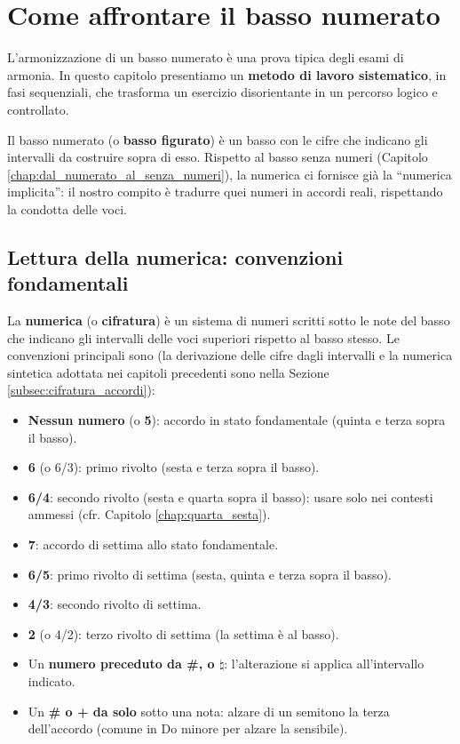 \chapter{Come affrontare il basso numerato}
\label{chap:metodo_lavoro}

L'armonizzazione di un basso numerato è una prova tipica degli esami di armonia. In questo capitolo presentiamo un \textbf{metodo di lavoro sistematico}, in fasi sequenziali, che trasforma un esercizio disorientante in un percorso logico e controllato.

Il basso numerato (o \textbf{basso figurato}) è un basso con le cifre che indicano gli intervalli da costruire sopra di esso. Rispetto al basso senza numeri (Capitolo \ref{chap:dal_numerato_al_senza_numeri}), la numerica ci fornisce già la ``numerica implicita'': il nostro compito è tradurre quei numeri in accordi reali, rispettando la condotta delle voci.

\section{Lettura della numerica: convenzioni fondamentali}
\label{sec:lettura_numerica}

\begin{definizione}
	\label{def:numerica}
	La \textbf{numerica} (o \textbf{cifratura}) è un sistema di numeri scritti sotto le note del basso che indicano gli intervalli delle voci superiori rispetto al basso stesso. Le convenzioni principali sono (la derivazione delle cifre dagli intervalli e la numerica sintetica adottata nei capitoli precedenti sono nella Sezione \ref{subsec:cifratura_accordi}):
	\begin{itemize}
		\item \textbf{Nessun numero} (o \textbf{5}): accordo in stato fondamentale (quinta e terza sopra il basso).
		\item \textbf{6} (o 6/3): primo rivolto (sesta e terza sopra il basso).
		\item \textbf{6/4}: secondo rivolto (sesta e quarta sopra il basso): usare solo nei contesti ammessi (cfr. Capitolo \ref{chap:quarta_sesta}).
		\item \textbf{7}: accordo di settima allo stato fondamentale.
		\item \textbf{6/5}: primo rivolto di settima (sesta, quinta e terza sopra il basso).
		\item \textbf{4/3}: secondo rivolto di settima.
		\item \textbf{2} (o 4/2): terzo rivolto di settima (la settima è al basso).
		\item Un \textbf{numero preceduto da \#, \flat{} o $\natural$}: l'alterazione si applica all'intervallo indicato.
		\item Un \textbf{\# o + da solo} sotto una nota: alzare di un semitono la terza dell'accordo (comune in Do minore per alzare la sensibile).
	\end{itemize}
\end{definizione}

